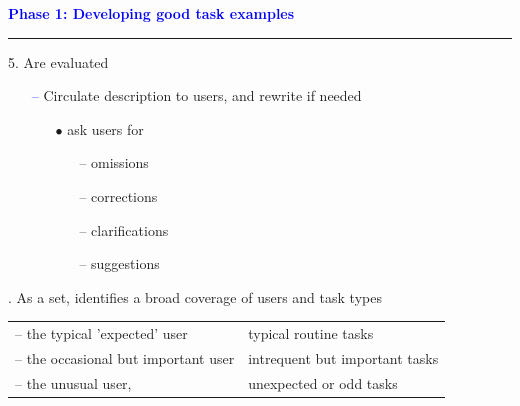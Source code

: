 \documentclass[pdf]{beamer}
\begin{document}
        
{%
\begin{frame}{}
	\vspace{8mm}
	\textcolor{Blue}{\textbf{\Large{Phase 1: Developing good task examples}}}
    \textcolor{red}{\rule{10cm}{1mm}}

    5. Are evaluated
        \begin{itemize}
        \item [\textcolor{Blue}{--}] Circulate description to users, and rewrite if needed
            \begin{itemize}
            \item[{$\bullet$}] ask users for
                  \begin{itemize}
                      \item[{--}] omissions
                      \item[{--}] corrections
                      \item[{--}] clarifications
                      \item[{--}] suggestions
                  \end{itemize}
            \end{itemize}
        \end{itemize}

    \bigskip
    . As a set, identifies a broad coverage of users and task types
    \begin{tabular}{ll}
    {--}  the typical 'expected' user & typical routine tasks \\
    {--}  the occasional but important user & intrequent but important tasks \\
    {--}  the unusual user, & unexpected or odd tasks \\
    \end{tabular}

\end{frame}}
\end{document}
